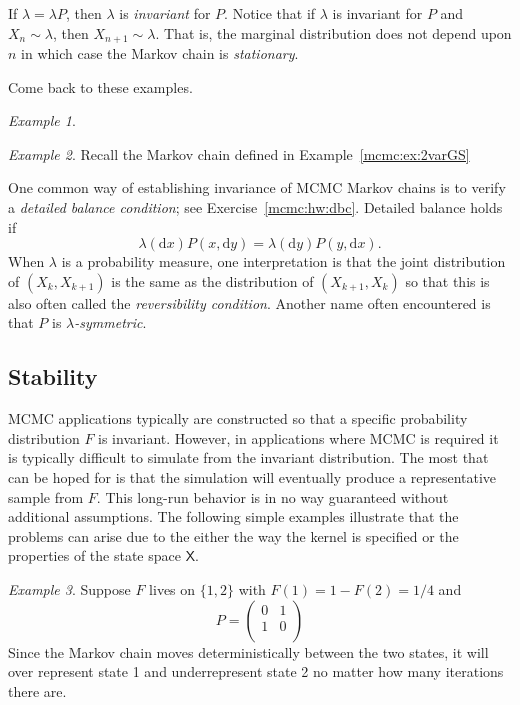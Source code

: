 \documentclass[12pt]{article}
\theoremstyle{plain}
\theoremstyle{definition}
\theoremstyle{remark}
\newtheorem{example}{Example}[section]
\newcommand{\df}{\mathrm{d}}
\newcommand{\X}{\mathsf{X}}
\begin{document}
If $\lambda = \lambda P$, then $\lambda$ is {\em invariant} for $P$.
Notice that if $\lambda$ is invariant for $P$ and $X_n \sim \lambda$,
then $X_{n+1} \sim \lambda$.  That is, the marginal distribution does
not depend upon $n$ in which case the Markov chain is {\em
  stationary}.

{\color{blue} Come back to these examples.}

\begin{example}
\end{example}

\begin{example}
  Recall the Markov chain defined in Example~\eqref{mcmc:ex:2varGS}
\end{example}


One common way of establishing invariance of MCMC Markov chains is to
verify a {\em detailed balance condition}; see
Exercise~\ref{mcmc:hw:dbc}.  Detailed balance holds if
\begin{equation}
   \label{mcmc:eq:dbc}
   \lambda(\df x) P(x, \df y) = \lambda(\df y) P(y, \df x). 
 \end{equation}
 When $\lambda$ is a probability measure, one interpretation is that
 the joint distribution of $(X_k, X_{k+1})$ is the same as the
 distribution of $(X_{k+1}, X_{k})$ so that this is also often called
 the {\em reversibility condition}.  Another name often encountered is
 that $P$ is {\em $\lambda$-symmetric}.

 \subsection{Stability}
 \label{mcmc:sec:stability}
 MCMC applications typically are constructed so that a specific
 probability distribution $F$ is invariant.  However, in applications
 where MCMC is required it is typically difficult to simulate from the
 invariant distribution.  The most that can be hoped for is that the
 simulation will eventually produce a representative sample from $F$.
 This long-run behavior is in no way guaranteed without additional
 assumptions. The following simple examples illustrate that the
 problems can arise due to the either the way the kernel is specified
 or the properties of the state space $\X$.

 \begin{example}
   \label{mcmc:ex:detmc}
   Suppose $F$ lives on $\{ 1, 2\}$ with $F(1) = 1 - F(2) = 1/4$ and
   \[
     P = \begin{pmatrix}
       0 & 1 \\
       1 & 0 \\
       \end{pmatrix}
   \]
   Since the Markov chain moves deterministically between the two
   states, it will over represent state 1 and underrepresent state 2
   no matter how many iterations there are.
 \end{example}
\end{document}
